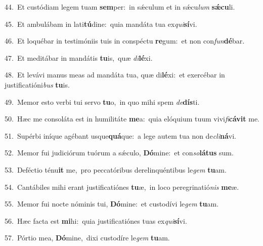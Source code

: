 {\numbfont\textcolor{\numbcolor}{44.}}~Et custódiam legem tuam \textbf{sem}\-per:~\star in sǽculum et in sǽcu\textit{lum} \textbf{sǽ}\-\textbf{cu}li.\par
{\numbfont\textcolor{\numbcolor}{45.}}~Et ambulábam in lati\-\textbf{tú}\-dine:~\star quia mandáta tua ex\-\textit{qui}\-\textbf{sí}vi.\par
{\numbfont\textcolor{\numbcolor}{46.}}~Et loquébar in testimóniis tuis in conspéctu \textbf{re}\-gum:~\star et non con\-\textit{fun}\-\textbf{dé}bar.\par
{\numbfont\textcolor{\numbcolor}{47.}}~Et meditábar in mandátis \textbf{tu}\-is,~\star quæ \textit{di}\-\textbf{lé}xi.\par
{\numbfont\textcolor{\numbcolor}{48.}}~Et levávi manus meas ad mandáta tua, quæ di\-\textbf{lé}\-xi:~\star et exercébar in justificatióni\textit{bus} \textbf{tu}\-is.\par
{\numbfont\textcolor{\numbcolor}{49.}}~Memor esto verbi tui servo \textbf{tu}\-o,~\star in quo mihi spem \textit{de}\-\textbf{dís}ti.\par
{\numbfont\textcolor{\numbcolor}{50.}}~Hæc me consoláta est in humilitáte \textbf{me}\-a:~\star quia elóquium tuum vivi\-\textit{fi}\-\textbf{cá}\textbf{vit} me.\par
{\numbfont\textcolor{\numbcolor}{51.}}~Supérbi iníque agébant usque\-\textbf{quá}\-que:~\star a lege autem tua non de\-\textit{cli}\-\textbf{ná}vi.\par
{\numbfont\textcolor{\numbcolor}{52.}}~Memor fui judiciórum tuórum a sǽculo, \textbf{Dó}\-mine:~\star et con\-\textit{so}\-\textbf{lá}\textbf{tus} sum.\par
{\numbfont\textcolor{\numbcolor}{53.}}~Deféctio ténu\textbf{it} me,~\star pro peccatóribus derelinquéntibus le\textit{gem} \textbf{tu}\-am.\par
{\numbfont\textcolor{\numbcolor}{54.}}~Cantábiles mihi erant justificatiónes \textbf{tu}\-æ,~\star in loco peregrinatió\textit{nis} \textbf{me}\-æ.\par
{\numbfont\textcolor{\numbcolor}{55.}}~Memor fui nocte nóminis tui, \textbf{Dó}\-mine:~\star et custodívi le\textit{gem} \textbf{tu}\-am.\par
{\numbfont\textcolor{\numbcolor}{56.}}~Hæc facta est \textbf{mi}\-hi:~\star quia justificatiónes tuas ex\-\textit{qui}\-\textbf{sí}vi.\par
{\numbfont\textcolor{\numbcolor}{57.}}~Pórtio mea, \textbf{Dó}\-mine,~\star dixi custodíre le\textit{gem} \textbf{tu}\-am.\par

